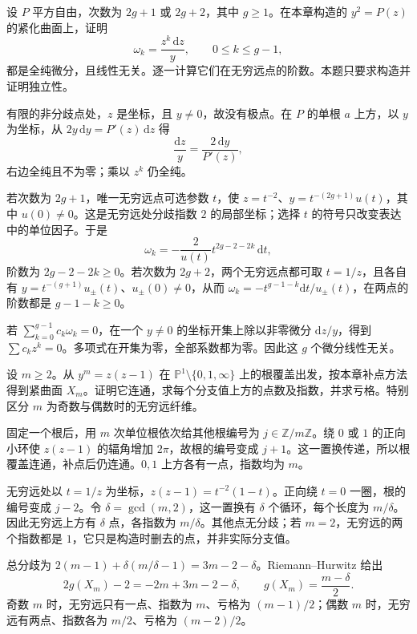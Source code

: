 \begin{exercise}
	\label{g4:ex:0201:hyperelliptic-forms}
	设 \(P\) 平方自由，次数为 \(2g+1\) 或 \(2g+2\)，其中 \(g\geq1\)。在本章构造的 \(y^2=P(z)\) 的紧化曲面上，证明
	\[
		\omega_k=\frac{z^k\,\mathrm{d}z}{y},\qquad 0\leq k\leq g-1,
	\]
	都是全纯微分，且线性无关。逐一计算它们在无穷远点的阶数。本题只要求构造并证明独立性。
\end{exercise}
\begin{solution}
	有限的非分歧点处，\(z\) 是坐标，且 \(y\ne0\)，故没有极点。在 \(P\) 的单根 \(a\) 上方，以 \(y\) 为坐标，从 \(2y\,\mathrm{d}y=P'(z)\,\mathrm{d}z\) 得
	\[
		\frac{\mathrm{d}z}{y}=\frac{2\,\mathrm{d}y}{P'(z)},
	\]
	右边全纯且不为零；乘以 \(z^k\) 仍全纯。

	若次数为 \(2g+1\)，唯一无穷远点可选参数 \(t\)，使 \(z=t^{-2}\)、\(y=t^{-(2g+1)}u(t)\)，其中 \(u(0)\ne0\)。这是无穷远处分歧指数 \(2\) 的局部坐标；选择 \(t\) 的符号只改变表达中的单位因子。于是
	\[
		\omega_k=-\frac{2}{u(t)}t^{2g-2-2k}\,\mathrm{d}t,
	\]
	阶数为 \(2g-2-2k\geq0\)。若次数为 \(2g+2\)，两个无穷远点都可取 \(t=1/z\)，且各自有 \(y=t^{-(g+1)}u_\pm(t)\)、\(u_\pm(0)\ne0\)，从而 \(\omega_k=-t^{g-1-k}\mathrm{d}t/u_\pm(t)\)，在两点的阶数都是 \(g-1-k\geq0\)。

	若 \(\sum_{k=0}^{g-1}c_k\omega_k=0\)，在一个 \(y\ne0\) 的坐标开集上除以非零微分 \(\mathrm{d}z/y\)，得到 \(\sum c_kz^k=0\)。多项式在开集为零，全部系数都为零。因此这 \(g\) 个微分线性无关。
\end{solution}

\begin{exercise}
	\label{g4:ex:0201:cyclic-family}
	设 \(m\geq2\)。从 \(y^m=z(z-1)\) 在 \(\mathbb P^1\setminus\{0,1,\infty\}\) 上的根覆盖出发，按本章补点方法得到紧曲面 \(X_m\)。证明它连通，求每个分支值上方的点数及指数，并求亏格。特别区分 \(m\) 为奇数与偶数时的无穷远纤维。
\end{exercise}
\begin{solution}
	固定一个根后，用 \(m\) 次单位根依次给其他根编号为 \(j\in\mathbb Z/m\mathbb Z\)。绕 \(0\) 或 \(1\) 的正向小环使 \(z(z-1)\) 的辐角增加 \(2\pi\)，故根的编号变成 \(j+1\)。这一置换传递，所以根覆盖连通，补点后仍连通。\(0,1\) 上方各有一点，指数均为 \(m\)。

	无穷远处以 \(t=1/z\) 为坐标，\(z(z-1)=t^{-2}(1-t)\)。正向绕 \(t=0\) 一圈，根的编号变成 \(j-2\)。令 \(\delta=\gcd(m,2)\)，这一置换有 \(\delta\) 个循环，每个长度为 \(m/\delta\)。因此无穷远上方有 \(\delta\) 点，各指数为 \(m/\delta\)。其他点无分歧；若 \(m=2\)，无穷远的两个指数都是 \(1\)，它只是构造时删去的点，并非实际分支值。

	总分歧为 \(2(m-1)+\delta(m/\delta-1)=3m-2-\delta\)。Riemann--Hurwitz 给出
	\[
		2g(X_m)-2=-2m+3m-2-\delta,
		\qquad g(X_m)=\frac{m-\delta}{2}.
	\]
	奇数 \(m\) 时，无穷远只有一点、指数为 \(m\)、亏格为 \((m-1)/2\)；偶数 \(m\) 时，无穷远有两点、指数各为 \(m/2\)、亏格为 \((m-2)/2\)。
\end{solution}

